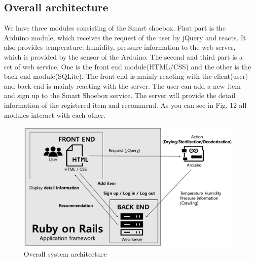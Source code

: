 \documentclass[conference]{IEEEtran}
\begin{document}
\subsection{Overall architecture} We have three modules consisting of the Smart shoebox. First part is the Arduino module, which receives the request of the user by jQuery and reacts. It also provides temperature, humidity, pressure information to the web server, which is provided by the sensor of the Arduino. The second and third part is a set of web service. One is the front end module(HTML/CSS) and the other is the back end module(SQLite). The front end is mainly reacting with the client(user) and back end is mainly reacting with the server. The user can add a new item and sign up to the Smart Shoebox service. The server will provide the detail information of the registered item and recommend. As you can see in Fig. 12 all modules interact with each other. 
\begin{figure}[H]
\begin{center}
    \includegraphics[scale=0.32]{overallarchitecture}
   \caption{Overall system architecture}\label{fig:label}
\end{center}
\end{figure}
\end{document}
